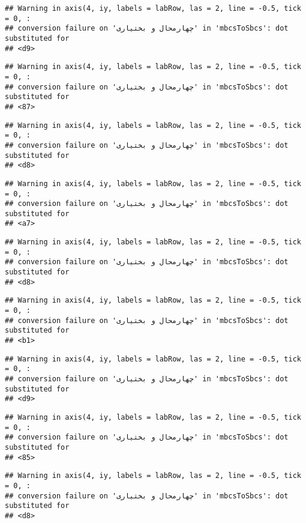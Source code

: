 \documentclass[
]{article}
\begin{document}
\begin{verbatim}
## Warning in axis(4, iy, labels = labRow, las = 2, line = -0.5, tick = 0, :
## conversion failure on 'چهارمحال و بختیاری' in 'mbcsToSbcs': dot substituted for
## <d9>
\end{verbatim}

\begin{verbatim}
## Warning in axis(4, iy, labels = labRow, las = 2, line = -0.5, tick = 0, :
## conversion failure on 'چهارمحال و بختیاری' in 'mbcsToSbcs': dot substituted for
## <87>
\end{verbatim}

\begin{verbatim}
## Warning in axis(4, iy, labels = labRow, las = 2, line = -0.5, tick = 0, :
## conversion failure on 'چهارمحال و بختیاری' in 'mbcsToSbcs': dot substituted for
## <d8>
\end{verbatim}

\begin{verbatim}
## Warning in axis(4, iy, labels = labRow, las = 2, line = -0.5, tick = 0, :
## conversion failure on 'چهارمحال و بختیاری' in 'mbcsToSbcs': dot substituted for
## <a7>
\end{verbatim}

\begin{verbatim}
## Warning in axis(4, iy, labels = labRow, las = 2, line = -0.5, tick = 0, :
## conversion failure on 'چهارمحال و بختیاری' in 'mbcsToSbcs': dot substituted for
## <d8>
\end{verbatim}

\begin{verbatim}
## Warning in axis(4, iy, labels = labRow, las = 2, line = -0.5, tick = 0, :
## conversion failure on 'چهارمحال و بختیاری' in 'mbcsToSbcs': dot substituted for
## <b1>
\end{verbatim}

\begin{verbatim}
## Warning in axis(4, iy, labels = labRow, las = 2, line = -0.5, tick = 0, :
## conversion failure on 'چهارمحال و بختیاری' in 'mbcsToSbcs': dot substituted for
## <d9>
\end{verbatim}

\begin{verbatim}
## Warning in axis(4, iy, labels = labRow, las = 2, line = -0.5, tick = 0, :
## conversion failure on 'چهارمحال و بختیاری' in 'mbcsToSbcs': dot substituted for
## <85>
\end{verbatim}

\begin{verbatim}
## Warning in axis(4, iy, labels = labRow, las = 2, line = -0.5, tick = 0, :
## conversion failure on 'چهارمحال و بختیاری' in 'mbcsToSbcs': dot substituted for
## <d8>
\end{verbatim}
\end{document}
